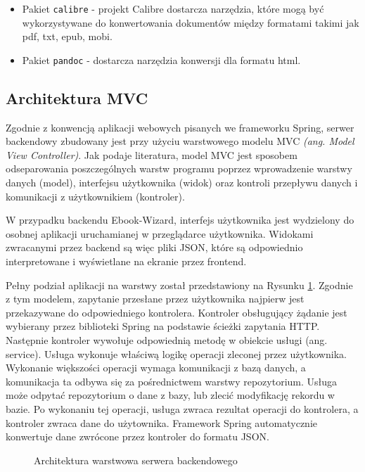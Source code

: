 \begin{itemize}
    \item Pakiet \verb|calibre| - projekt Calibre dostarcza narzędzia, które mogą być wykorzystywane do konwertowania dokumentów między formatami takimi jak pdf, txt, epub, mobi. \cite{calibre_user_manual}
    \item Pakiet \verb|pandoc| - dostarcza narzędzia konwersji dla formatu html. \cite{pandoc_user_manual}
\end{itemize}

\subsection{Architektura MVC}
\label{subsection:mvc_architecture}

Zgodnie z konwencją aplikacji webowych pisanych we frameworku Spring, serwer backendowy zbudowany jest przy użyciu warstwowego modelu MVC \textit{(ang. Model View Controller)}. Jak podaje literatura, model MVC jest sposobem odseparowania poszczególnych warstw programu poprzez wprowadzenie warstwy danych (model), interfejsu użytkownika (widok) oraz kontroli przepływu danych i komunikacji z użytkownikiem (kontroler). \cite{spring_in_action_book}

W przypadku backendu Ebook-Wizard, interfejs użytkownika jest wydzielony do osobnej aplikacji uruchamianej w przeglądarce użytkownika. Widokami zwracanymi przez backend są więc pliki JSON, które są odpowiednio interpretowane i wyświetlane na ekranie przez frontend.

Pełny podział aplikacji na warstwy został przedstawiony na Rysunku \ref{fig:backend_layers}. Zgodnie z tym modelem, zapytanie przesłane przez użytkownika najpierw jest przekazywane do odpowiedniego kontrolera. Kontroler obsługujący żądanie jest wybierany przez biblioteki Spring na podstawie ścieżki zapytania HTTP. Następnie kontroler wywołuje odpowiednią metodę w obiekcie usługi (ang. service). Usługa wykonuje właściwą logikę operacji zleconej przez użytkownika. Wykonanie większości operacji wymaga komunikacji z bazą danych, a komunikacja ta odbywa się za pośrednictwem warstwy repozytorium. Usługa może odpytać repozytorium o dane z bazy, lub zlecić modyfikację rekordu w bazie. Po wykonaniu tej operacji, usługa zwraca rezultat operacji do kontrolera, a kontroler zwraca dane do użytownika. Framework Spring automatycznie konwertuje dane zwrócone przez kontroler do formatu JSON.

\begin{figure}[h]
    \centering
    \setlength{\fboxsep}{0pt}
    \setlength{\fboxrule}{0.4pt}
    
    \caption{Architektura warstwowa serwera backendowego}
    \label{fig:backend_layers}
\end{figure}

